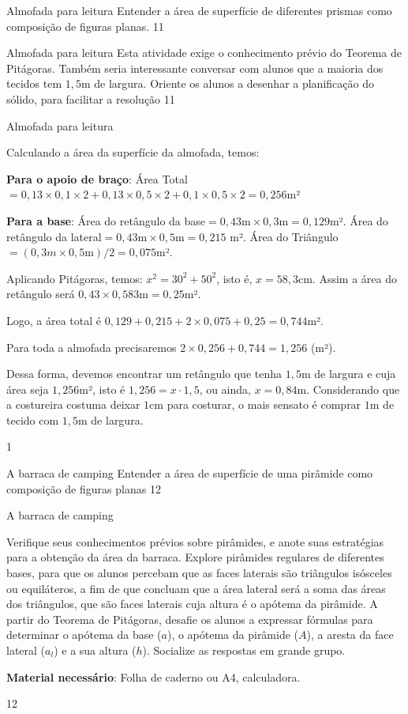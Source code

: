 \begin{objectives}{Almofada para leitura}
{
Entender a área de superfície de diferentes prismas como composição de figuras planas. 
}{1}{1}
\end{objectives}
\begin{sugestions}{Almofada para leitura}
{
Esta atividade exige o conhecimento prévio do Teorema de Pitágoras. Também seria interessante conversar com alunos que a maioria dos tecidos tem $1{,}5$m de largura. Oriente os alunos a desenhar a planificação do sólido, para facilitar a resolução
}{1}{1}
\end{sugestions}
\clearmargin
\marginpar{\vspace{.5em}}
\begin{answer}{Almofada para leitura}
{
Calculando a área da superfície da almofada, temos:

\textbf{Para o apoio de braço}: Área Total$=0{,}13\times0{,}1\times2+ 0{,}13\times 0{,}5 \times 2 + 0{,}1 \times 0{,}5 \times 2= 0{,}256$m²

\textbf{Para a base}: Área do retângulo da base$=0{,}43 \text{m} \times 0{,}3 \text{m} = 0{,}129$m². Área do retângulo da lateral$=0{,}43 \text{m} \times 0{,}5 \text{m} = 0{,}215$ m². Área do Triângulo $= (0{,}3 m \times 0{,}5 \text{m}) / 2=0{,}075$m².

Aplicando Pitágoras, temos: $x^2 = 30^2 + 50^2$, isto é, $x=58{,}3$cm. Assim a área do retângulo será $0{,}43\times0{,}583 \text{m}=0{,}25$m².

Logo, a área total é $0{,}129 + 0{,}215 + 2 \times 0{,}075 +0{,}25 = 0{,}744$m².

Para toda a almofada precisaremos $2 \times 0{,}256 + 0{,}744 = 1{,}256$ (m²).

Dessa forma, devemos encontrar um retângulo que tenha $1{,}5$m de largura e cuja área seja $1{,}256$m², isto é $1,256= x\cdot1{,}5$, ou ainda, $x=0{,}84$m. Considerando que a costureira costuma deixar $1$cm para costurar, o mais sensato é comprar $1$m de tecido com $1{,}5$m de largura.

}{1}
\end{answer}
\begin{objectives}{A barraca de camping}
{
  Entender a área de superfície de uma pirâmide como composição de figuras planas
}{1}{2}
\end{objectives}
\begin{sugestions}{A barraca de camping}
{
Verifique seus conhecimentos prévios sobre pirâmides, e anote suas estratégias para a obtenção da área da barraca. Explore pirâmides regulares de diferentes bases, para que os alunos percebam que as faces laterais são triângulos isósceles ou equiláteros, a fim de que concluam que a área lateral será a soma das áreas dos triângulos, que são faces laterais cuja altura é o apótema da pirâmide. A partir do Teorema de Pitágoras, desafie os alunos a expressar fórmulas para determinar o apótema da base ($a$), o apótema da pirâmide ($A$), a aresta da face lateral ($a_l$) e a sua altura ($h$). Socialize as respostas em grande grupo. 

\textbf{Material necessário}: Folha de caderno ou A4, calculadora.

}{1}{2}
\end{sugestions}
